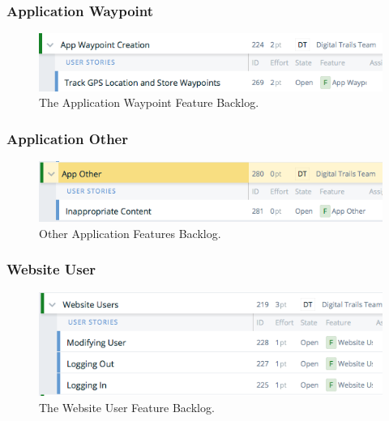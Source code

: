 \documentclass[11pt,a4paper]{article}
\begin{document}
\subsubsection{Application Waypoint}
\begin{figure}[H]
\centering
\includegraphics[width = 140mm]{backlog/AppWaypoint.png}
\caption{The Application Waypoint Feature Backlog.}
\label{fig:backlogappway}
\end{figure}

\subsubsection{Application Other}
\begin{figure}[H]
\centering
\includegraphics[width = 140mm]{backlog/AppOther.png}
\caption{Other Application Features Backlog.}
\label{fig:backlogappother}
\end{figure}

\subsubsection{Website User}
\begin{figure}[H]
\centering
\includegraphics[width = 140mm]{backlog/WebUser.png}
\caption{The Website User Feature Backlog.}
\label{fig:backlogwebUser}
\end{figure}
\end{document}

